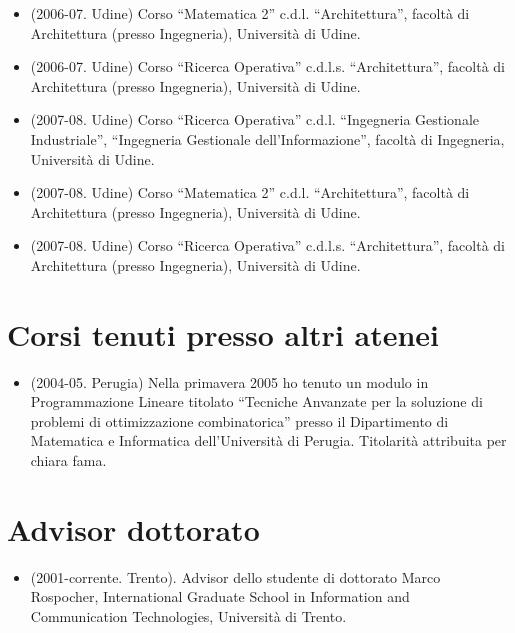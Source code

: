 \documentclass[11pt]{article}
\begin{document}
\begin{itemize}
\item (2006-07. Udine) Corso 
``Matematica 2''
c.d.l. ``Architettura'',
facolt\`a di Architettura (presso Ingegneria), Universit\`a di Udine. 

\item (2006-07. Udine) Corso 
``Ricerca Operativa''
c.d.l.s. ``Architettura'',
facolt\`a di Architettura (presso Ingegneria), Universit\`a di Udine. 

\item (2007-08. Udine) Corso 
``Ricerca Operativa''
c.d.l. ``Ingegneria Gestionale Industriale'',
         ``Ingegneria Gestionale dell'Informazione'', 
facolt\`a di Ingegneria, Universit\`a di Udine. 

\item (2007-08. Udine) Corso 
``Matematica 2''
c.d.l. ``Architettura'',
facolt\`a di Architettura (presso Ingegneria), Universit\`a di Udine. 

\item (2007-08. Udine) Corso 
``Ricerca Operativa''
c.d.l.s. ``Architettura'',
facolt\`a di Architettura (presso Ingegneria), Universit\`a di Udine. 

\end{itemize}


\section{Corsi tenuti presso altri atenei}

\begin{itemize}

\item (2004-05. Perugia) Nella primavera 2005
ho tenuto un modulo in Programmazione Lineare
titolato ``Tecniche Anvanzate per la soluzione di problemi di ottimizzazione
combinatorica''
presso il Dipartimento di Matematica e Informatica
dell'Universit\`a di Perugia.
Titolarit\`a attribuita per chiara fama. 

\end{itemize}

\section{Advisor dottorato}

\begin{itemize}
\item (2001-corrente. Trento). Advisor dello studente di dottorato
  Marco Rospocher, International Graduate School in Information and
  Communication Technologies, Universit\`a di Trento. 
\end{itemize}
\end{document}
